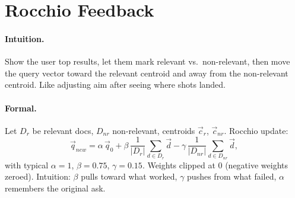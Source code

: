 \section{Rocchio Feedback}\label{sec:rocchio}
\paragraph{Intuition.} Show the user top results, let them mark relevant vs.\ non-relevant, then move the query vector toward the relevant centroid and away from the non-relevant centroid. Like adjusting aim after seeing where shots landed.

\paragraph{Formal.} Let $D_r$ be relevant docs, $D_{nr}$ non-relevant, centroids $\vec{c}_r$, $\vec{c}_{nr}$. Rocchio update:
\begin{equation}
\vec{q}_{new} = \alpha\,\vec{q}_0 + \beta\,\frac{1}{|D_r|}\sum_{d\in D_r}\vec{d} - \gamma\,\frac{1}{|D_{nr}|}\sum_{d\in D_{nr}}\vec{d},
\end{equation}
with typical $\alpha=1$, $\beta=0.75$, $\gamma=0.15$. Weights clipped at $0$ (negative weights zeroed). Intuition: $\beta$ pulls toward what worked, $\gamma$ pushes from what failed, $\alpha$ remembers the original ask.

